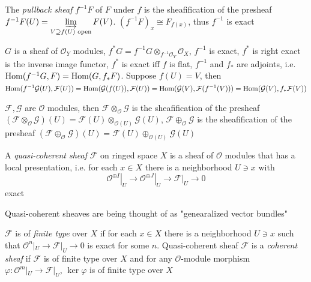 \documentclass[main]{subfiles}
\begin{document}
\begin{definition}
The \textit{pullback sheaf} $f^{-1}F$ of $F$ under $f$ is the sheafification of the presheaf $f^{-1}F(U)=\displaystyle\varinjlim_{V\supseteq f(U)\text{ open}}F(V)$. $(f^{-1}F)_x\cong F_{f(x)}$, thus $f^{-1}$ is exact
\end{definition}

\begin{definition}
$G$ is a sheaf of $\mathcal O_Y$ modules, $f^*G=f^{-1}G\otimes_{f^{-1}\mathcal O_Y}\mathcal O_X$, $f^{-1}$ is exact, $f^*$ is right exact is the inverse image functor, $f^*$ is exact iff $f$ is flat, $f^{-1}$ and $f_*$ are adjoints, i.e. $\operatorname{Hom}(f^{-1}G,F)=\operatorname{Hom}(G,f_*F)$. Suppose $f(U)=V$, then $\operatorname{Hom}(f^{-1}\mathcal G(U),\mathcal F(U))=\operatorname{Hom}(\mathcal G(f(U)),\mathcal F(U))=\operatorname{Hom}(\mathcal G(V),\mathcal F(f^{-1}(V)))=\operatorname{Hom}(\mathcal G(V),f_*\mathcal F(V))$
\end{definition}

\begin{definition}
$\mathcal F,\mathcal G$ are $\mathcal O$ modules, then $\mathcal F\otimes_{\mathcal O}\mathcal G$ is the sheafification of the presheaf $(\mathcal F\otimes_{\mathcal O}\mathcal G)(U)=\mathcal F(U)\otimes_{\mathcal O(U)}\mathcal G(U)$, $\mathcal F\oplus_{\mathcal O}\mathcal G$ is the sheafification of the presheaf $(\mathcal F\oplus_{\mathcal O}\mathcal G)(U)=\mathcal F(U)\oplus_{\mathcal O(U)}\mathcal G(U)$
\end{definition}

\begin{definition}
A \textit{quasi-coherent sheaf} $\mathcal F$ on ringed space $X$ is a sheaf of $\mathcal O$ modules that has a local presentation, i.e. for each $x\in X$ there is a neighborhood $U\ni x$ with
\[\left.\mathcal O^{\oplus I}\right|_{U}\to\left.\mathcal O^{\oplus J}\right|_{U}\to\mathcal F|_{U}\to0\]
exact
\end{definition}

\begin{note}
Quasi-coherent sheaves are being thought of as "genearalized vector bundles"
\end{note}

\begin{definition}
$\mathcal F$ is of \textit{finite type} over $X$ if for each $x\in X$ there is a neighborhood $U\ni x$ such that $\mathcal O^n|_{U}\to\mathcal F|_U\to0$ is exact for some $n$. Quasi-coherent sheaf $\mathcal F$ is a \textit{coherent sheaf} if $\mathcal F$ is of finite type over $X$ and for any $\mathcal O$-module morphism $\varphi:\mathcal O^m|_U\to\mathcal F|_U$, $\ker\varphi$ is of finite type over $X$
\end{definition}
\end{document}

